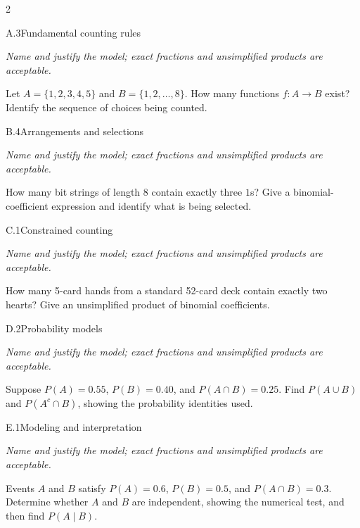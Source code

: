 \documentclass[9pt]{extarticle}
\begin{document}
\begin{multicols}{2}
\begin{CoreProblem}{A.3}{Fundamental counting rules}
{\scriptsize\textit{Name and justify the model; exact fractions and unsimplified products are acceptable.}\par}
Let $A=\{1,2,3,4,5\}$ and $B=\{1,2,\ldots,8\}$. How many functions
    $f:A\to B$ exist? Identify the sequence of choices being counted.
\end{CoreProblem}
\begin{CoreProblem}{B.4}{Arrangements and selections}
{\scriptsize\textit{Name and justify the model; exact fractions and unsimplified products are acceptable.}\par}
How many bit strings of length 8 contain exactly three $1$s? Give a
    binomial-coefficient expression and identify what is being selected.
\end{CoreProblem}
\begin{CoreProblem}{C.1}{Constrained counting}
{\scriptsize\textit{Name and justify the model; exact fractions and unsimplified products are acceptable.}\par}
How many 5-card hands from a standard 52-card deck contain exactly
    two hearts? Give an unsimplified product of binomial coefficients.
\end{CoreProblem}
\columnbreak
\begin{CoreProblem}{D.2}{Probability models}
{\scriptsize\textit{Name and justify the model; exact fractions and unsimplified products are acceptable.}\par}
Suppose $P(A)=0.55$, $P(B)=0.40$, and $P(A\cap B)=0.25$. Find
    $P(A\cup B)$ and $P(A^c\cap B)$, showing the probability identities used.
\end{CoreProblem}
\begin{CoreProblem}{E.1}{Modeling and interpretation}
{\scriptsize\textit{Name and justify the model; exact fractions and unsimplified products are acceptable.}\par}
Events $A$ and $B$ satisfy $P(A)=0.6$, $P(B)=0.5$, and
    $P(A\cap B)=0.3$. Determine whether $A$ and $B$ are independent, showing
    the numerical test, and then find $P(A\mid B)$.
\end{CoreProblem}
\end{multicols}
\CoreWorkArea
\FormBreak
{}
\end{document}
